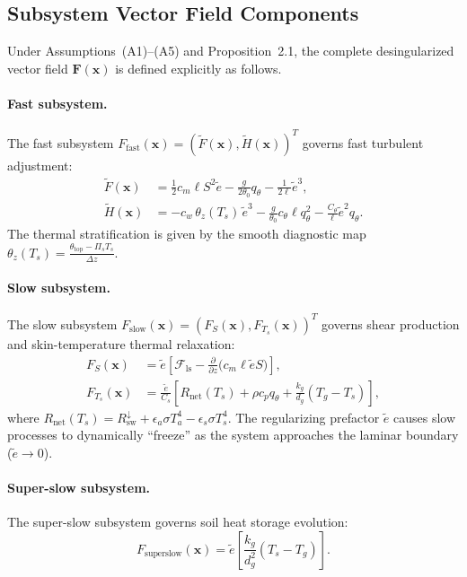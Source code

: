 \subsection{Subsystem Vector Field Components}

Under Assumptions~(A1)--(A5) and Proposition~2.1, the complete desingularized vector field $\mathbf{F}(\mathbf{x})$ is defined explicitly as follows.

\paragraph{Fast subsystem.}
The fast subsystem $F_{\mathrm{fast}}(\mathbf{x}) = (\tilde F(\mathbf{x}), \tilde H(\mathbf{x}))^T$ governs fast turbulent adjustment:
\begin{align}
\tilde F(\mathbf{x}) &= \frac{1}{2} c_m \ell S^2 \tilde e - \frac{g}{2\theta_0} q_\theta - \frac{1}{2\ell} \tilde e^3, \\
\tilde H(\mathbf{x}) &= - c_w \, \theta_z(T_s) \, \tilde e^3 - \frac{g}{\theta_0} c_\theta \ell q_\theta^2 - \frac{C_\theta}{\ell} \tilde e^2 q_\theta.
\end{align}
The thermal stratification is given by the smooth diagnostic map $\theta_z(T_s) = \frac{\theta_{\mathrm{top}} - \Pi_s T_s}{\Delta z}$.

\paragraph{Slow subsystem.}
The slow subsystem $F_{\mathrm{slow}}(\mathbf{x}) = (F_S(\mathbf{x}), F_{T_s}(\mathbf{x}))^T$ governs shear production and skin-temperature thermal relaxation:
\begin{align}
F_S(\mathbf{x}) &= \tilde e \left[ \mathcal{F}_{\mathrm{ls}} - \frac{\partial}{\partial z}\big(c_m \ell \tilde e S\big) \right], \\
F_{T_s}(\mathbf{x}) &= \frac{\tilde e}{C_s} \left[ R_{\mathrm{net}}(T_s) + \rho c_p q_\theta + \frac{k_g}{d_g}(T_g - T_s) \right],
\end{align}
where $R_{\mathrm{net}}(T_s) = R_{\mathrm{sw}}^{\downarrow} + \epsilon_a \sigma T_a^4 - \epsilon_s \sigma T_s^4$. The regularizing prefactor $\tilde e$ causes slow processes to dynamically ``freeze'' as the system approaches the laminar boundary ($\tilde e \to 0$).

\paragraph{Super-slow subsystem.}
The super-slow subsystem governs soil heat storage evolution:
\begin{equation}
F_{\mathrm{superslow}}(\mathbf{x}) = \tilde e \left[ \frac{k_g}{d_g^2}(T_s - T_g) \right].
\end{equation}

